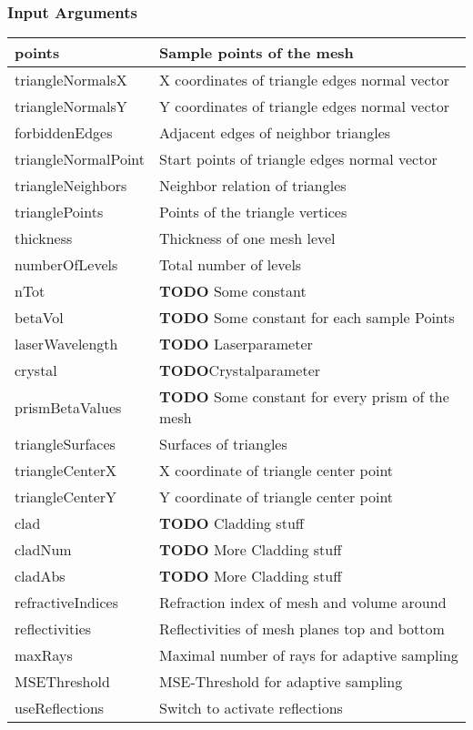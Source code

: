 \subsubsection{Input Arguments}
\label{label:input}
\begin{supertabular}{| p{3cm} | p{4cm} |}
  points & Sample points of the mesh \\\hline
  triangleNormalsX & X coordinates of triangle edges normal vector \\\hline
  triangleNormalsY & Y coordinates of triangle edges normal vector \\\hline
  forbiddenEdges & Adjacent edges of neighbor triangles\\\hline
  triangleNormalPoint & Start points of triangle edges normal vector \\\hline
  triangleNeighbors & Neighbor relation of triangles \\\hline
  trianglePoints & Points of the triangle vertices \\\hline
  thickness & Thickness of one mesh level \\\hline
  numberOfLevels & Total number of levels \\\hline
  nTot & \textbf{TODO} Some constant \\\hline
  betaVol & \textbf{TODO} Some constant for each sample Points \\\hline
  laserWavelength & \textbf{TODO} Laserparameter \\\hline
  crystal & \textbf{TODO}Crystalparameter \\\hline
  prismBetaValues & \textbf{TODO} Some constant for every prism of the mesh \\\hline
  triangleSurfaces & Surfaces of triangles \\\hline
  triangleCenterX & X coordinate of triangle center point\\\hline
  triangleCenterY & Y coordinate of triangle center point\\\hline
  clad & \textbf{TODO} Cladding stuff \\\hline
  cladNum & \textbf{TODO} More Cladding stuff \\\hline
  cladAbs & \textbf{TODO} More Cladding stuff \\\hline
  refractiveIndices &  Refraction index of mesh and volume around \\\hline
  reflectivities & Reflectivities of mesh planes top and bottom \\\hline
  maxRays & Maximal number of rays for adaptive sampling \\\hline
  MSEThreshold & MSE-Threshold for adaptive sampling \\\hline
  useReflections & Switch to activate reflections \\\hline
\end{supertabular}

